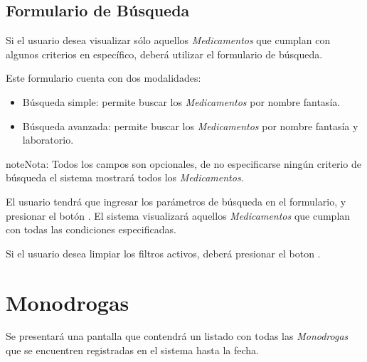 \documentclass[a4paper,10pt,spanish]{sphinxmanual}
\begin{document}


\subsection{Formulario de Búsqueda}
\label{medicams:formulario-busqueda-medicamento}\label{medicams:formulario-de-busqueda}
Si el usuario desea visualizar sólo aquellos \emph{Medicamentos} que cumplan con algunos criterios en específico, deberá utilizar el formulario de búsqueda.


Este formulario cuenta con dos modalidades:
\begin{itemize}
\item {} 
Búsqueda simple: permite buscar los \emph{Medicamentos} por nombre fantasía.

\item {} 
Búsqueda avanzada: permite buscar los \emph{Medicamentos} por nombre fantasía y laboratorio.

\end{itemize}

\begin{notice}{note}{Nota:}
Todos los campos son opcionales, de no especificarse ningún criterio de búsqueda el sistema mostrará todos los \emph{Medicamentos}.
\end{notice}

El usuario tendrá que ingresar los parámetros de búsqueda en el formulario, y presionar el botón . El sistema visualizará aquellos \emph{Medicamentos} que cumplan con todas las condiciones especificadas.

Si el usuario desea limpiar los filtros activos, deberá presionar el boton .



\section{Monodrogas}
\label{monodrogas:monodrogas}\label{monodrogas::doc}
Se presentará una pantalla que contendrá un listado con todas las \emph{Monodrogas} que se encuentren registradas en el sistema hasta la fecha.
\end{document}
